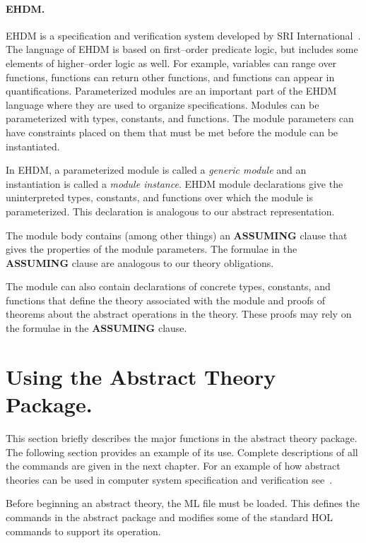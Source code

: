 \paragraph{EHDM.}
EHDM is a specification and verification system developed by SRI
International~\cite{ehdm:manual}.  The language of EHDM is based on
first--order predicate logic, but includes some elements of higher--order
logic as well.  For example, variables can range over functions, functions
can return other functions, and functions can appear in quantifications.
Parameterized modules are an important part of the EHDM language where they
are used to organize specifications.  Modules can be parameterized with
types, constants, and functions.  The module parameters can have
constraints placed on them that must be met before the module can be
instantiated.

In EHDM, a parameterized module is called a {\em generic module} and an
instantiation is called a {\em module instance}.  EHDM module declarations
give the uninterpreted types, constants, and functions over which the
module is parameterized.  This declaration is analogous to our abstract
representation. 

The module body contains (among other things) an {\bf ASSUMING} clause that
gives the properties of the module parameters.  The formulae in the {\bf
ASSUMING} clause are analogous to our theory obligations.

The module can also contain declarations of concrete types, constants, and
functions that define the theory associated with the module and proofs of
theorems about the abstract operations in the theory.  These proofs may
rely on the formulae in the {\bf ASSUMING} clause.

\section{Using the Abstract Theory Package.}
This section briefly describes the major functions in the abstract theory
package.  The following section provides an example of its use.  Complete
descriptions of all the commands are given in the next chapter. For an
example of how abstract theories can be used in computer system
specification and verification see~\cite{windley:ah,windley:git}.

Before beginning an abstract theory, the ML file  must be
loaded.  This defines the commands in the abstract package and modifies
some of the standard HOL commands to support its operation.

